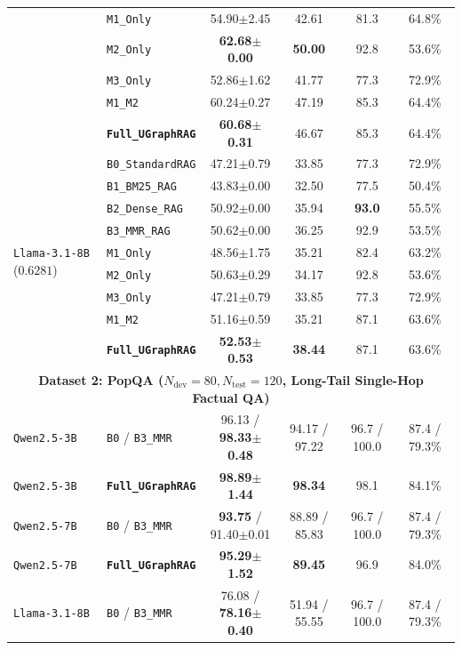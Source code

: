 \documentclass[11pt]{article}
\begin{document}
\begin{table}[t]
{{\begin{tabular}{llcccc}
& \texttt{M1\_Only} & 54.90$\pm$2.45 & 42.61 & 81.3 & 64.8\% \\
& \texttt{M2\_Only} & \textbf{62.68$\pm$0.00} & \textbf{50.00} & 92.8 & 53.6\% \\
& \texttt{M3\_Only} & 52.86$\pm$1.62 & 41.77 & 77.3 & 72.9\% \\
& \texttt{M1\_M2} & 60.24$\pm$0.27 & 47.19 & 85.3 & 64.4\% \\
& \textbf{\texttt{Full\_UGraphRAG}} & \textbf{60.68$\pm$0.31} & 46.67 & 85.3 & 64.4\% \\
\midrule
\multirow{9}{*}{\texttt{Llama-3.1-8B} ($0.6281$)}
& \texttt{B0\_StandardRAG} & 47.21$\pm$0.79 & 33.85 & 77.3 & 72.9\% \\
& \texttt{B1\_BM25\_RAG} & 43.83$\pm$0.00 & 32.50 & 77.5 & 50.4\% \\
& \texttt{B2\_Dense\_RAG} & 50.92$\pm$0.00 & 35.94 & \textbf{93.0} & 55.5\% \\
& \texttt{B3\_MMR\_RAG} & 50.62$\pm$0.00 & 36.25 & 92.9 & 53.5\% \\
& \texttt{M1\_Only} & 48.56$\pm$1.75 & 35.21 & 82.4 & 63.2\% \\
& \texttt{M2\_Only} & 50.63$\pm$0.29 & 34.17 & 92.8 & 53.6\% \\
& \texttt{M3\_Only} & 47.21$\pm$0.79 & 33.85 & 77.3 & 72.9\% \\
& \texttt{M1\_M2} & 51.16$\pm$0.59 & 35.21 & 87.1 & 63.6\% \\
& \textbf{\texttt{Full\_UGraphRAG}} & \textbf{52.53$\pm$0.53} & \textbf{38.44} & 87.1 & 63.6\% \\
\midrule
\multicolumn{6}{c}{\textbf{Dataset 2: PopQA ($N_{\text{dev}}=80, N_{\text{test}}=120$, Long-Tail Single-Hop Factual QA)}} \\
\midrule
\texttt{Qwen2.5-3B} & \texttt{B0} / \texttt{B3\_MMR} & 96.13 / \textbf{98.33$\pm$0.48} & 94.17 / 97.22 & 96.7 / 100.0 & 87.4 / 79.3\% \\
\texttt{Qwen2.5-3B} & \textbf{\texttt{Full\_UGraphRAG}} & \textbf{98.89$\pm$1.44} & \textbf{98.34} & 98.1 & 84.1\% \\
\texttt{Qwen2.5-7B} & \texttt{B0} / \texttt{B3\_MMR} & \textbf{93.75} / 91.40$\pm$0.01 & 88.89 / 85.83 & 96.7 / 100.0 & 87.4 / 79.3\% \\
\texttt{Qwen2.5-7B} & \textbf{\texttt{Full\_UGraphRAG}} & \textbf{95.29$\pm$1.52} & \textbf{89.45} & 96.9 & 84.0\% \\
\texttt{Llama-3.1-8B} & \texttt{B0} / \texttt{B3\_MMR} & 76.08 / \textbf{78.16$\pm$0.40} & 51.94 / 55.55 & 96.7 / 100.0 & 87.4 / 79.3\% \\

\end{tabular}}}
\end{table}
\end{document}

